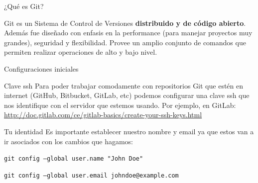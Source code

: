 \documentclass{beamer}
\begin{document}
\begin{frame}{¿Qué es Git?}

	\begin{block}{}
		Git es un Sistema de Control de Versiones \textbf{distribuido y de código abierto}. Además fue diseñado con enfasis en la performance (para manejar proyectos muy grandes), seguridad y flexibilidad.  Provee un amplio conjunto de comandos que permiten realizar operaciones de alto y bajo nivel.
	\end{block}
\end{frame}

\begin{frame}[fragile]{Configuraciones iniciales}

	\begin{block}{Clave ssh}
		Para poder trabajar comodamente con repositorios Git que estén en internet (GitHub, Bitbucket, GitLab, etc) podemos configurar una clave ssh que nos identifique con el servidor que estemos usando.
		Por ejemplo, en GitLab: \url{http://doc.gitlab.com/ce/gitlab-basics/create-your-ssh-keys.html}
	\end{block}

    \begin{block}{Tu identidad}
        Es importante establecer nuestro nombre y email ya que estos van a ir asociados con los cambios que hagamos:

        \vspace{0.5em}

        \texttt{git config --global user.name "John Doe"}

        \texttt{git config --global user.email johndoe@example.com}
    \end{block}


\end{frame}
\end{document}
